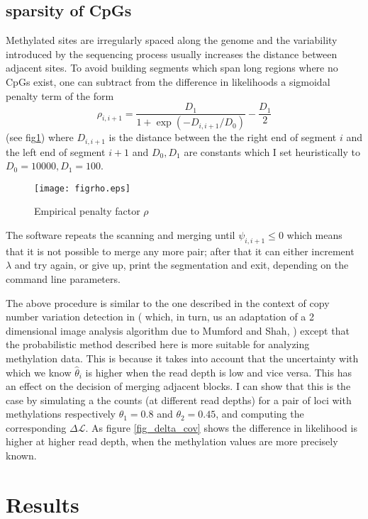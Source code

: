 \documentclass[12pt]{amsart}
\newcommand{\lik}{\ensuremath{\mathcal{L}}}
\begin{document}
\subsection{sparsity of CpGs}
Methylated sites are irregularly 
spaced along the genome and the variability 
introduced by the sequencing process usually increases the distance 
between adjacent sites.
To avoid building segments which span long regions where no CpGs exist, one 
can subtract from the difference in likelihoods a sigmoidal penalty term of the
form \[\rho_{i,i+1}=\frac{D_1}{1+\exp(-D_{i,i+1}/D_0)}-\frac{D_1}{2}\] (see fig\ref{figrho}) 
where $D_{i,i+1}$ is the distance 
between the the right end of segment $i$ and the left end of segment $i+1$ and 
$D_0,D_1$ are constants which  I set heuristically to  $D_0=10000,D_1=100$. 

\begin{figure}\label{figrho}
\texttt{[image: figrho.eps]}
\caption{Empirical penalty factor $\rho$}
\end{figure}

The software repeats the scanning and merging until $\psi_{i,i+1} \leq 0$ 
which means that it is not possible to 
merge any more pair; after that it can either increment $\lambda$ and try again, 
or give up, print the segmentation and exit, depending on the command line parameters.

The above procedure is similar to the one
described in the context of copy number variation detection in \cite{vega} 
( which, in turn, us an adaptation 
of a 2 dimensional image analysis algorithm due to Mumford and Shah, 
\cite{mumfordshah}) except that the probabilistic method  described
here is more suitable for analyzing methylation data. This is because it 
takes into account that the
uncertainty with which we know $\hat{\theta}_i$ is higher when the read depth 
is low and vice versa.
This has an effect on the decision of merging adjacent blocks. I can show that 
this is the case by simulating
a the counts (at different read depths) for a pair of loci with 
methylations respectively 
$\theta_1=0.8$ and $\theta_2=0.45$,
and computing the corresponding $\Delta  \lik$.  
As figure \ref{fig_delta_cov} shows the difference in likelihood is higher 
at higher read depth, when the methylation values are more precisely known.

\section{Results}
\end{document}
